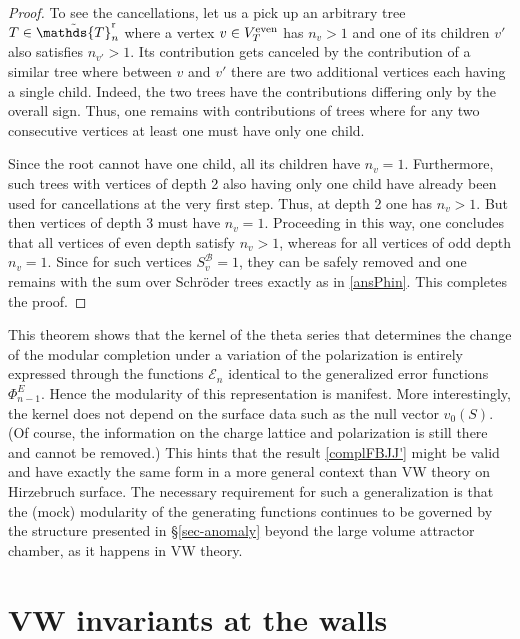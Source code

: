 \documentclass[12pt,letterpaper]{JHEP3}
\newcommand{\IT}{\mathds{T}}
\def\Bv{\mathscr{B}}
\def\Ev{\mathscr{E}}
\def\nv{v_0}
\begin{document}
\begin{proof}
To see the cancellations, let us a pick up an arbitrary tree $T\in \tilde\IT^{\rm r}_n$ where 
a vertex $v\in V_T^{\rm even}$ has $n_v>1$ and one of its children $v'$ also satisfies $n_{v'}>1$. 
Its contribution gets canceled by the contribution of a similar tree where 
between $v$ and $v'$ there are two additional vertices each having a single child. Indeed, the two trees have the contributions 
differing only by the overall sign. Thus, one remains with contributions of trees where 
for any two consecutive vertices at least one must have only one child.

Since the root cannot have one child, all its children have $n_v=1$. 
Furthermore, such trees with vertices of depth 2 also having only one child have already been used for cancellations
at the very first step. Thus, at depth 2 one has $n_v>1$. But then vertices of depth 3 must have $n_v=1$.
Proceeding in this way, one concludes that all vertices of even depth satisfy $n_v>1$, whereas for all vertices of odd depth $n_v=1$.
Since for such vertices $S^\Bv_v=1$, they can be safely removed and one remains with the sum over Schr\"oder trees 
exactly as in \eqref{ansPhin}.
This completes the proof.
\end{proof}

This theorem shows that the kernel of the theta series that determines the change of the modular completion under a variation of 
the polarization is entirely expressed through the functions $\Ev_n$ identical to the generalized error functions $\Phi^E_{n-1}$.
Hence the modularity of this representation is manifest. More interestingly, the kernel does not depend on the surface data
such as the null vector $\nv(S)$. (Of course, the information on the charge lattice and polarization is still there and cannot be removed.)
This hints that the result \eqref{complFBJJ'} might be valid and have exactly the same form 
in a more general context than VW theory on Hirzebruch surface.
The necessary requirement for such a generalization is that the (mock) modularity of the generating functions continues to be governed 
by the structure presented in \S\ref{sec-anomaly} beyond the large volume attractor chamber,
as it happens in VW theory.


\section{VW invariants at the walls}
\label{sec-VEwall}
\end{document}
